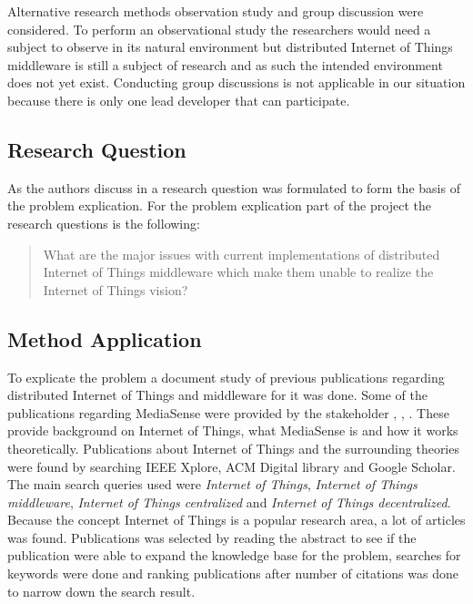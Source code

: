 Alternative research methods observation study and group discussion were considered. To perform an observational study the researchers would need a subject to observe in its natural environment but distributed Internet of Things middleware is still a subject of research and as such the intended environment does not yet exist. Conducting group discussions is not applicable in our situation because there is only one lead developer that can participate. 

\subsection{Research Question}
As the authors discuss in \cite{johannesson2012design} a research question was formulated to form the basis of the problem explication. For the problem explication part of the project the research questions is the following: 

\begin{quotation}
What are the major issues with current implementations of distributed Internet of Things middleware which make them unable to realize the Internet of Things vision?
\end{quotation}

\subsection{Method Application}
To explicate the problem a document study of previous publications regarding distributed Internet of Things and middleware for it was done. Some of the publications regarding MediaSense were provided by the stakeholder \cite{TheMediaSenseFramework}, \cite{Kanter539187}, \cite{Walters413794}. These provide background on Internet of Things, what MediaSense is and how it works theoretically. Publications about Internet of Things and the surrounding theories were found by searching IEEE Xplore, ACM Digital library and Google Scholar. The main search queries used were \emph{Internet of Things}, \emph{Internet of Things middleware}, \emph{Internet of Things centralized} and \emph{Internet of Things decentralized}. Because the concept Internet of Things is a popular research area, a lot of articles was found. Publications was selected by reading the abstract to see if the publication were able to expand the knowledge base for the problem, searches for keywords were done and ranking publications after number of citations was done to narrow down the search result. 

